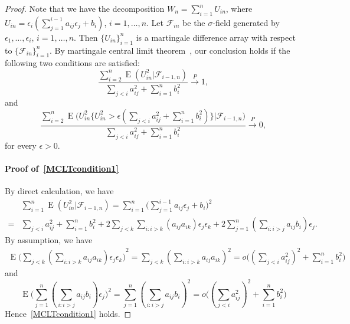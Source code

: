 \documentclass[review]{elsarticle}
\DeclareMathOperator{\myE}{E}
\theoremstyle{plain}
\theoremstyle{definition}
\theoremstyle{remark}
\begin{document}
 \begin{proof}
     Note that we have the decomposition $W_n=\sum_{i=1}^n U_{in}$, where $U_{in} =\epsilon_i (\sum_{j=1}^{i-1} a_{ij}\epsilon_j+b_i )$, $i=1,\ldots,n$.
    Let $\mathcal{F}_{in}$ be the $\sigma$-field generated by $\epsilon_1,\ldots,\epsilon_i$, $i=1,\ldots, n$.
     Then $\{U_{in}\}_{i=1}^n$ is a martingale difference array with respect to $\{\mathcal{F}_{in}\}_{i=1}^n$. 
     By martingale central limit theorem~\citep[Theorem 1 of Chapter VIII ]{pollard1984convergence}, our conclusion holds if the following two conditions are satisfied:
     \begin{equation}\label{MCLTcondition1}
         \frac{\sum_{i=2}^n \myE(U_{in}^2 |\mathcal{F}_{i-1,n})}{\sum_{j<i} a_{ij}^2+\sum_{i=1}^n b_i^2}\xrightarrow{P} 1,
     \end{equation}
     and
     \begin{equation}\label{MCLTcondition2}
         \frac{\sum_{i=2}^n \myE\big(U_{in}^2\big\{U_{in}^2>\epsilon (\sum_{j<i} a_{ij}^2+\sum_{i=1}^n b_i^2)\big\}\big|\mathcal{F}_{i-1,n}\big)}{\sum_{ j<i} a_{ij}^2+\sum_{i=1}^n b_i^2}\xrightarrow{P} 0,
     \end{equation}
     for every $\epsilon>0$.

     \paragraph{Proof of~\eqref{MCLTcondition1}}
By direct calculation, we have
     \begin{equation*}
         \begin{aligned}
             &\sum_{i=1}^n \myE(U_{in}^2 |\mathcal{F}_{i-1,n})
             =\sum_{i=1}^n \big(\sum_{j=1}^{i-1}a_{ij}\epsilon_j +b_i \big)^2\\
             =&\sum_{j<i} a_{ij}^2+\sum_{i=1}^n b_i^2 +2\sum_{j<k} \sum_{i:i>k}(a_{ij}a_{ik})\epsilon_j \epsilon_k+2\sum_{j=1}^n (\sum_{i:i>j} a_{ij}b_i) \epsilon_j.
         \end{aligned}
     \end{equation*}
     By assumption, we have
     \begin{equation*}
         \begin{aligned}
             \myE{\big(\sum_{j<k} (\sum_{i:i>k}a_{ij}a_{ik})\epsilon_j \epsilon_k \big)}^2
             =
             \sum_{j<k} (\sum_{i:i>k}a_{ij}a_{ik})^2
             =
             o\big((\sum_{j<i} a_{ij}^2)^2 +\sum_{i=1}^n b_i^2\big)
         \end{aligned}
     \end{equation*}
     and
     $$
     \myE \big(\sum_{j=1}^n (\sum_{i:i>j} a_{ij}b_i) \epsilon_j\big)^2
     =
     \sum_{j=1}^n (\sum_{i:i>j} a_{ij}b_i)^2 
             =
             o\big((\sum_{j<i} a_{ij}^2)^2 +\sum_{i=1}^n b_i^2\big)
     $$
     Hence~\eqref{MCLTcondition1} holds.

\end{proof}
\end{document}
